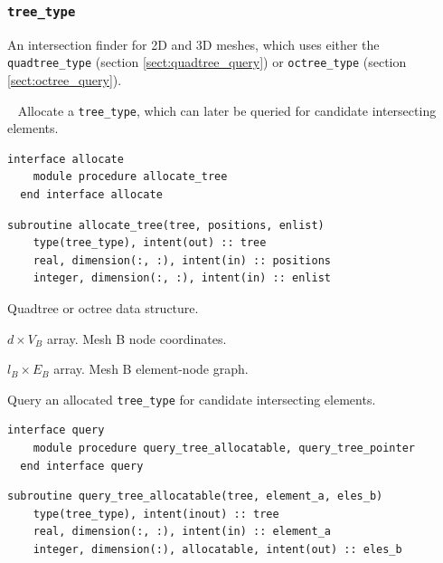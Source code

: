 \documentclass{article}
\begin{document}
\subsubsection{\texttt{tree\_type}}

An intersection finder for 2D and 3D meshes, which uses either the
\verb+quadtree_type+ (section \ref{sect:quadtree_query}) or \verb+octree_type+
(section \ref{sect:octree_query}).

~\newline
Allocate a \verb+tree_type+, which can later be queried for candidate
intersecting elements.

\begin{lstlisting}[language=FORTRAN]
  interface allocate
    module procedure allocate_tree
  end interface allocate
\end{lstlisting}
  
\begin{lstlisting}[language=FORTRAN]
  subroutine allocate_tree(tree, positions, enlist)
    type(tree_type), intent(out) :: tree
    real, dimension(:, :), intent(in) :: positions
    integer, dimension(:, :), intent(in) :: enlist
\end{lstlisting}

\begin{description}[font=\ttfamily\bfseries,leftmargin=2.2\parindent,labelindent=1.7\parindent,noitemsep]
  \item[tree] Quadtree or octree data structure.
  \item[positions] $d \times V_B$ array. Mesh B node coordinates.
  \item[enlist] $l_B \times E_B$ array. Mesh B element-node graph.
\end{description}

\noindent Query an allocated \verb+tree_type+ for candidate intersecting
elements.
  
\begin{lstlisting}[language=FORTRAN]
  interface query
    module procedure query_tree_allocatable, query_tree_pointer
  end interface query
\end{lstlisting}
    
\begin{lstlisting}[language=FORTRAN]  
  subroutine query_tree_allocatable(tree, element_a, eles_b)
    type(tree_type), intent(inout) :: tree
    real, dimension(:, :), intent(in) :: element_a
    integer, dimension(:), allocatable, intent(out) :: eles_b
\end{lstlisting}
  
\end{document}
